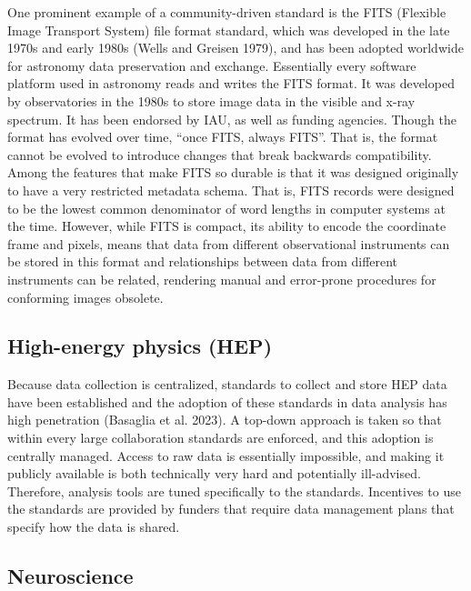 \documentclass[
  letterpaper,
  DIV=11,
  numbers=noendperiod]{scrartcl}
\begin{document}
One prominent example of a community-driven standard is the FITS
(Flexible Image Transport System) file format standard, which was
developed in the late 1970s and early 1980s (Wells and Greisen 1979),
and has been adopted worldwide for astronomy data preservation and
exchange. Essentially every software platform used in astronomy reads
and writes the FITS format. It was developed by observatories in the
1980s to store image data in the visible and x-ray spectrum. It has been
endorsed by IAU, as well as funding agencies. Though the format has
evolved over time, ``once FITS, always FITS''. That is, the format
cannot be evolved to introduce changes that break backwards
compatibility. Among the features that make FITS so durable is that it
was designed originally to have a very restricted metadata schema. That
is, FITS records were designed to be the lowest common denominator of
word lengths in computer systems at the time. However, while FITS is
compact, its ability to encode the coordinate frame and pixels, means
that data from different observational instruments can be stored in this
format and relationships between data from different instruments can be
related, rendering manual and error-prone procedures for conforming
images obsolete.

\subsection{High-energy physics (HEP)}\label{high-energy-physics-hep}

Because data collection is centralized, standards to collect and store
HEP data have been established and the adoption of these standards in
data analysis has high penetration (Basaglia et al. 2023). A top-down
approach is taken so that within every large collaboration standards are
enforced, and this adoption is centrally managed. Access to raw data is
essentially impossible, and making it publicly available is both
technically very hard and potentially ill-advised. Therefore, analysis
tools are tuned specifically to the standards. Incentives to use the
standards are provided by funders that require data management plans
that specify how the data is shared.

\subsection{Neuroscience}\label{neuroscience}
\end{document}
